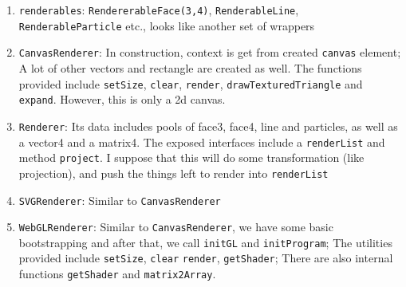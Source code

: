 \begin{enumerate}
  \begin{enumerate}
  \def\labelenumii{\arabic{enumii}.}
  \tightlist
  \item
    \texttt{renderables}: \texttt{RendererableFace(3,4)},
    \texttt{RenderableLine}, \texttt{RenderableParticle} etc., looks
    like another set of wrappers
  \item
    \texttt{CanvasRenderer}: In construction, context is get from
    created \texttt{canvas} element; A lot of other vectors and
    rectangle are created as well. The functions provided include
    \texttt{setSize}, \texttt{clear}, \texttt{render},
    \texttt{drawTexturedTriangle} and \texttt{expand}. However, this is
    only a 2d canvas.
  \item
    \texttt{Renderer}: Its data includes pools of face3, face4, line and
    particles, as well as a vector4 and a matrix4. The exposed
    interfaces include a \texttt{renderList} and method
    \texttt{project}. I suppose that this will do some transformation
    (like projection), and push the things left to render into
    \texttt{renderList}
  \item
    \texttt{SVGRenderer}: Similar to \texttt{CanvasRenderer}
  \item
    \texttt{WebGLRenderer}: Similar to \texttt{CanvasRenderer}, we have
    some basic bootstrapping and after that, we call \texttt{initGL} and
    \texttt{initProgram}; The utilities provided include
    \texttt{setSize}, \texttt{clear} \texttt{render},
    \texttt{getShader}; There are also internal functions
    \texttt{getShader} and \texttt{matrix2Array}.


\end{enumerate}
\end{enumerate}
